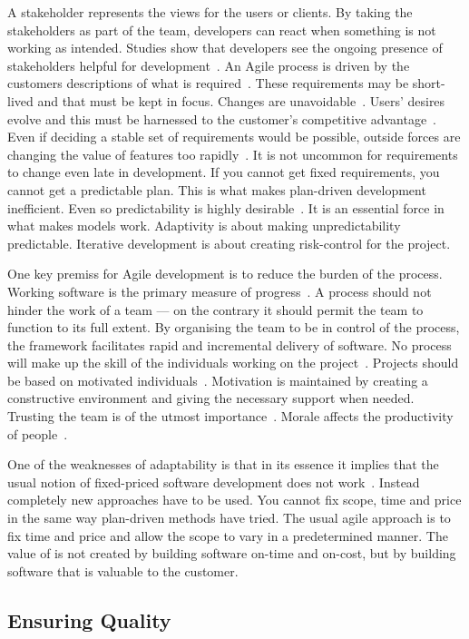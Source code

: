 \documentclass[english]{tktltiki2}
\begin{document}
A stakeholder represents the views for the users or clients. By taking the stakeholders as part of the team, developers can react when something is not working as intended. Studies show that developers see the ongoing presence of stakeholders helpful for development~\cite{DD08}. An Agile process is driven by the customers descriptions of what is required~\cite{BBB01b}. These requirements may be short-lived and that must be kept in focus. Changes are unavoidable~\cite{Fow05}. Users’ desires evolve and this must be harnessed to the customer’s competitive advantage~\cite{BBB01b, Fow05}. Even if deciding a stable set of requirements would be possible, outside forces are changing the value of features too rapidly~\cite{Fow05}. It is not uncommon for requirements to change even late in development. If you cannot get fixed requirements, you cannot get a predictable plan. This is what makes plan-driven development inefficient. Even so predictability is highly desirable~\cite{Fow05}. It is an essential force in what makes models work. Adaptivity is about making unpredictability predictable. Iterative development is about creating risk-control for the project.

One key premiss for Agile development is to reduce the burden of the process. Working software is the primary measure of progress~\cite{BBB01b}. A process should not hinder the work of a team — on the contrary it should permit the team to function to its full extent. By organising the team to be in control of the process, the framework facilitates rapid and incremental delivery of software. No process will make up the skill of the individuals working on the project~\cite{Fow05}. Projects should be based on motivated individuals~\cite{BBB01b}. Motivation is maintained by creating a constructive environment and giving the necessary support when needed. Trusting the team is of the utmost importance~\cite{BBB01b}. Morale affects the productivity of people~\cite{Fow05}.

One of the weaknesses of adaptability is that in its essence it implies that the usual notion of fixed-priced software development does not work~\cite{Fow05}. Instead completely new approaches have to be used. You cannot fix scope, time and price in the same way plan-driven methods have tried. The usual agile approach is to fix time and price and allow the scope to vary in a predetermined manner. The value of is not created by building software on-time and on-cost, but by building software that is valuable to the customer.

\subsection{Ensuring Quality}
\end{document}
